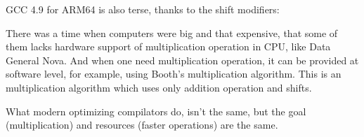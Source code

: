



GCC 4.9 for ARM64 is also terse, thanks to the shift modifiers:




There was a time when computers were big and that expensive, that some of them lacks hardware support of multiplication
operation in \ac{CPU}, like Data General Nova.
And when one need multiplication operation, it can be provided at software level, for example, using Booth's multiplication
algorithm.
This is an multiplication algorithm which uses only addition operation and shifts.

What modern optimizing compilators do, isn't the same,
but the goal (multiplication) and resources (faster operations) are the same.

